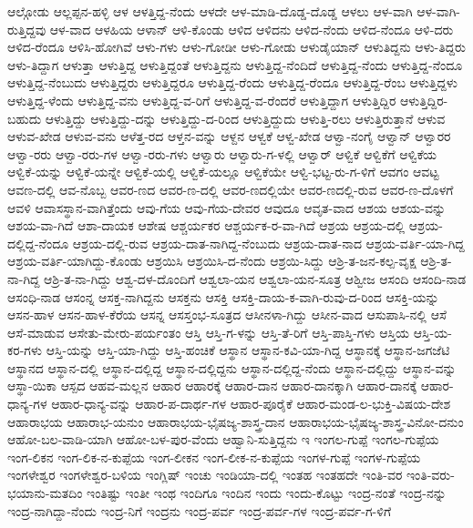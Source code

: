 ಆಲ್ಗೋಡು
ಆಲ್ಲಪ್ಪನ-ಹಳ್ಳಿ
ಆಳ
ಆಳತ್ತಿದ್ದ-ನೆಂದು
ಆಳದೇ
ಆಳ-ಮಾಡಿ-ದೊಡ್ಡ-ದೊಡ್ಡ
ಆಳಲು
ಆಳ-ವಾಗಿ
ಆಳ-ವಾಗಿ-ರುತ್ತಿದ್ದವು
ಆಳ-ವಾದ
ಆಳಹಿಯ
ಆಳಾನ್
ಆಳಿ-ಕೊಂಡು
ಆಳಿದ
ಆಳಿದನು
ಆಳಿದ-ನೆಂದು
ಆಳಿದ-ನೆಂದೂ
ಆಳಿ-ದರು
ಆಳಿದ-ರೆಂದೂ
ಆಳಿಸಿ-ಹೋಗಿವೆ
ಆಳು-ಗಳು
ಆಳು-ಗೋಡೀ
ಆಳು-ಗೋಡು
ಆಳುಡೈಯಾನ್
ಆಳುತಿದ್ದನು
ಆಳು-ತಿದ್ದರು
ಆಳು-ತಿದ್ದಾಗ
ಆಳುತ್ತಾ
ಆಳುತ್ತಿದ್ದ
ಆಳುತ್ತಿದ್ದಂತೆ
ಆಳುತ್ತಿದ್ದನು
ಆಳುತ್ತಿದ್ದ-ನೆಂದಿದೆ
ಆಳುತ್ತಿದ್ದ-ನೆಂದು
ಆಳುತ್ತಿದ್ದ-ನೆಂದೂ
ಆಳುತ್ತಿದ್ದ-ನೆಂಬುದು
ಆಳುತ್ತಿದ್ದರು
ಆಳುತ್ತಿದ್ದರೂ
ಆಳುತ್ತಿದ್ದ-ರೆಂದು
ಆಳುತ್ತಿದ್ದ-ರೆಂದೂ
ಆಳುತ್ತಿದ್ದ-ರೆಂಬ
ಆಳುತ್ತಿದ್ದಳು
ಆಳುತ್ತಿದ್ದ-ಳೆಂದು
ಆಳುತ್ತಿದ್ದ-ವನು
ಆಳುತ್ತಿದ್ದ-ವ-ರಿಗೆ
ಆಳುತ್ತಿದ್ದ-ವ-ರೆಂದರೆ
ಆಳುತ್ತಿದ್ದಾಗ
ಆಳುತ್ತಿದ್ದಿರ
ಆಳುತ್ತಿದ್ದಿರ-ಬಹುದು
ಆಳುತ್ತಿದ್ದು
ಆಳುತ್ತಿದ್ದು-ದನ್ನು
ಆಳುತ್ತಿದ್ದು-ದ-ರಿಂದ
ಆಳುತ್ತಿದ್ದುದು
ಆಳುತ್ತಿ-ರಲು
ಆಳುತ್ತಿರುತ್ತಾನೆ
ಆಳುವ
ಆಳುವ-ಖೇಡ
ಆಳುವ-ವನು
ಆಳೆತ್ತ-ರದ
ಆಳ್ತನ-ವನ್ನು
ಆಳ್ದನ
ಆಳ್ವಕೆ
ಆಳ್ವ-ಖೇಡ
ಆಳ್ವಾ-ನಂಗೈ
ಆಳ್ವಾನ್
ಆಳ್ವಾರರ
ಆಳ್ವಾ-ರರು
ಆಳ್ವಾ-ರರು-ಗಳ
ಆಳ್ವಾ-ರರು-ಗಳು
ಆಳ್ವಾರು
ಆಳ್ವಾರು-ಗ-ಳಲ್ಲಿ
ಆಳ್ವಾರ್
ಆಳ್ವಿಕೆ
ಆಳ್ವಿಕೆಗೆ
ಆಳ್ವಿಕೆಯ
ಆಳ್ವಿಕೆ-ಯನ್ನು
ಆಳ್ವಿಕೆ-ಯನ್ನೇ
ಆಳ್ವಿಕೆ-ಯಲ್ಲಿ
ಆಳ್ವಿಕೆ-ಯಲ್ಲೂ
ಆಳ್ವಿಕೆಯೇ
ಆಳ್ವಿ-ಭಟ್ಟ-ರು-ಗ-ಳಿಗೆ
ಆವಗಂ
ಆವಟ್ಟ
ಆವಣ-ದಲ್ಲಿ
ಆವ-ನೊಬ್ಬ
ಆವರ-ಣದ
ಆವರ-ಣ-ದಲ್ಲಿ
ಆವರ-ಣದಲ್ಲಿಯೇ
ಆವರ-ಣದಲ್ಲಿ-ರುವ
ಆವರ-ಣ-ದೊಳಗೆ
ಆವಳಿ
ಆವಾಸಸ್ಥಾನ-ವಾಗಿತ್ತೆಂದು
ಆವು-ಗೆಯ
ಆವು-ಗೆಯ-ದೇವರ
ಆವುದೂ
ಆವೃತ-ವಾದ
ಆಶಯ
ಆಶಯ-ವನ್ನು
ಆಶಯ-ವಾ-ಗಿದೆ
ಆಶಾ-ದಾಯಕ
ಆಶೇಷ
ಆಶ್ಚರ್ಯಕರ
ಆಶ್ಚರ್ಯಕ-ರ-ವಾ-ಗಿದೆ
ಆಶ್ರಯ
ಆಶ್ರಯ-ದಲ್ಲಿ
ಆಶ್ರಯ-ದಲ್ಲಿದ್ದ-ನೆಂದೂ
ಆಶ್ರಯ-ದಲ್ಲಿ-ರುವ
ಆಶ್ರಯ-ದಾತ-ನಾಗಿದ್ದ-ನೆಂಬುದು
ಆಶ್ರಯ-ದಾತ-ನಾದ
ಆಶ್ರಯ-ವರ್ತಿ-ಯಾ-ಗಿದ್ದ
ಆಶ್ರಯ-ವರ್ತಿ-ಯಾಗಿದ್ದು-ಕೊಂಡು
ಆಶ್ರಯಿಸಿ
ಆಶ್ರಯಿಸಿ-ದ-ನೆಂದು
ಆಶ್ರಯಿ-ಸಿದ್ದು
ಆಶ್ರಿ-ತ-ಜನ-ಕಲ್ಪ-ವೃಕ್ಷ
ಆಶ್ರಿ-ತ-ನಾ-ಗಿದ್ದ
ಆಶ್ರಿ-ತ-ನಾ-ಗಿದ್ದು
ಆಶ್ವ-ದಳ-ದೊಂದಿಗೆ
ಆಶ್ವಲಾ-ಯನ
ಆಶ್ವಲಾ-ಯನ-ಸೂತ್ರ
ಆಶ್ವೀಜ
ಆಸಂದಿ
ಆಸಂದಿ-ನಾಡ
ಆಸಂಧಿ-ನಾಡ
ಆಸಂನ್ನ
ಆಸಕ್ತ-ನಾಗಿದ್ದನು
ಆಸಕ್ತನು
ಆಸಕ್ತಿ
ಆಸಕ್ತಿ-ದಾಯ-ಕ-ವಾಗಿ-ರುವು-ದ-ರಿಂದ
ಆಸಕ್ತಿ-ಯನ್ನು
ಆಸನ-ಹಾಳ
ಆಸನ-ಹಾಳ-ಕೆರೆಯ
ಆಸನ್ನ
ಆಸಸ್ತಂಭ-ಸೂತ್ರದ
ಆಸೀನಳಾ-ಗಿದ್ದು
ಆಸೀನ-ವಾದ
ಆಸುಪಾಸಿ-ನಲ್ಲಿ
ಆಸೆ
ಆಸೆ-ಮಾಡುವ
ಆಸೇತು-ಮೇರು-ಪರ್ಯಂತಂ
ಆಸ್ತಿ
ಆಸ್ತಿ-ಗ-ಳನ್ನು
ಆಸ್ತಿ-ತೆ-ರಿಗೆ
ಆಸ್ತಿ-ಪಾಸ್ತಿ-ಗಳು
ಆಸ್ತಿಯ
ಆಸ್ತಿ-ಯ-ಕರ-ಗಳು
ಆಸ್ತಿ-ಯನ್ನು
ಆಸ್ತಿ-ಯಾ-ಗಿದ್ದು
ಆಸ್ತಿ-ಹಂಚಿಕೆ
ಆಸ್ಥಾನ
ಆಸ್ಥಾನ-ಕವಿ-ಯಾ-ಗಿದ್ದ
ಆಸ್ಥಾನಕ್ಕೆ
ಆಸ್ಥಾನ-ಜಗಜೆಟಿ
ಆಸ್ಥಾನದ
ಆಸ್ಥಾನ-ದಲ್ಲಿ
ಆಸ್ಥಾನ-ದಲ್ಲಿದ್ದ
ಆಸ್ಥಾನ-ದಲ್ಲಿದ್ದನು
ಆಸ್ಥಾನ-ದಲ್ಲಿದ್ದ-ನೆಂದು
ಆಸ್ಥಾನ-ದಲ್ಲಿದ್ದು
ಆಸ್ಥಾನ-ವನ್ನು
ಆಸ್ಥಾ-ಯಿಕಾ
ಆಸ್ಪದ
ಆಹವ-ಮಲ್ಲನ
ಆಹಾರ
ಆಹಾರಕ್ಕೆ
ಆಹಾರ-ದಾನ
ಆಹಾರ-ದಾನಕ್ಕಾಗಿ
ಆಹಾರ-ದಾನಕ್ಕೆ
ಆಹಾರ-ಧಾನ್ಯ-ಗಳ
ಆಹಾರ-ಧಾನ್ಯ-ವನ್ನು
ಆಹಾರ-ಪ-ದಾರ್ಥ-ಗಳ
ಆಹಾರ-ಪೂರೈಕೆ
ಆಹಾರ-ಮಂಡ-ಲ-ಭುಕ್ತಿ-ವಿಷಯ-ದೇಶ
ಆಹಾರಾಭಯ
ಆಹಾರಾಭ-ಯನುಂ
ಆಹಾರಾಭಯ-ಭೈಷಜ್ಯ-ಶಾಸ್ತ್ರ-ದಾನ
ಆಹಾರಾಭಯ-ಭೈಷಜ್ಯ-ಶಾಸ್ತ್ರ-ವಿನೋ-ದನುಂ
ಆಹೋ-ಬಲ-ವಾಡಿ-ಯಾಗಿ
ಆಹೋ-ಬಳ-ಪುರ-ವೆಂದು
ಆಹ್ವಾನಿ-ಸುತ್ತಿದ್ದನು
ಇ
ಇಂಗಲ-ಗುಪ್ಪೆ
ಇಂಗಲ-ಗುಪ್ಪೆಯ
ಇಂಗ-ಲಿಕನ
ಇಂಗ-ಲಿಕ-ನ-ಕುಪ್ಪೆಯ
ಇಂಗ-ಲೀಕನ
ಇಂಗ-ಲೀಕ-ನ-ಕುಪ್ಪೆಯ
ಇಂಗಳ-ಗುಪ್ಪೆ
ಇಂಗಳ-ಗುಪ್ಪೆಯ
ಇಂಗಳೇಶ್ವರ
ಇಂಗಳೇಶ್ವರ-ಬಳಿಯ
ಇಂಗ್ಲಿಷ್
ಇಂಚು
ಇಂಡಿಯಾ-ದಲ್ಲಿ
ಇಂತಹ
ಇಂತಹದೇ
ಇಂತಿ-ವರ
ಇಂತಿ-ವರು-ಭಯಾನು-ಮತದಿಂ
ಇಂತಿಷ್ಟು
ಇಂತೀ
ಇಂಥ
ಇಂದಿಗೂ
ಇಂದಿನ
ಇಂದು
ಇಂದು-ಕೊಟ್ಟು
ಇಂದ್ರ-ನಂತೆ
ಇಂದ್ರ-ನನ್ನು
ಇಂದ್ರ-ನಾಗಿದ್ದಾ-ನೆಂದು
ಇಂದ್ರ-ನಿಗೆ
ಇಂದ್ರನು
ಇಂದ್ರ-ಪರ್ವ
ಇಂದ್ರ-ಪರ್ವ-ಗಳ
ಇಂದ್ರ-ಪರ್ವ-ಗ-ಳಿಗೆ
